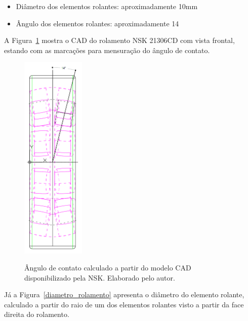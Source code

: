 \documentclass[
	12pt,				
	oneside,			
	a4paper,			
	english,			
	brazil,			
	]{abntex2ppgsi}
\begin{document}
\begin{itemize}
	\item Diâmetro dos elementos rolantes: aproximadamente 10\si{\mm}
	\item Ângulo dos elementos rolantes: aproximadamente 14\textdegree
\end{itemize}

A Figura~\ref{angulo_de_contato} mostra o CAD do rolamento NSK 21306CD com vista frontal, estando com as marcações para mensuração do ângulo de contato. 

\begin{figure}[H]
\centering
\caption {Ângulo de contato calculado a partir do modelo CAD disponibilizado pela NSK. Elaborado pelo autor.}
\includegraphics[width=\textwidth,height=100mm,keepaspectratio]{angulo_de_contato}
\label{angulo_de_contato}
\end{figure} 

Já a Figura~\ref{diametro_rolamento} apresenta o diâmetro do elemento rolante, calculado a partir do raio de um dos elementos rolantes visto a partir da face direita do rolamento. 
\end{document}
